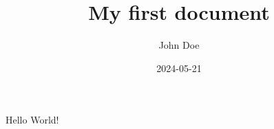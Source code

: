 \documentclass{article}
\title{My first document}
\date{2024-05-21}
\author{John Doe}
\begin{document}
  \maketitle
  \newpage

  Hello World!
\end{document}
